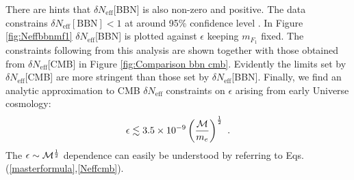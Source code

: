 \documentclass[12pt]{article}
\begin{document}
There are hints that $\delta N _{\text{eff}}$[BBN] is also non-zero and positive. The data constrains $\delta N _{\text{eff}}[\text{BBN}] < 1$ at around 95\% confidence level \cite{izotov}. In Figure \ref{fig:Neffbbnmf1} $\delta N _{\text{eff}}$[BBN] is plotted against $\epsilon$ keeping $m _{F_1}$ fixed. The constraints following from this analysis are shown together with those obtained from $\delta N _{\text{eff}}$[CMB] in Figure \ref{fig:Comparison bbn cmb}. Evidently the limits set by $\delta N _{\text{eff}}$[CMB] are more stringent than those set by $\delta N _{\text{eff}}$[BBN]. Finally, we find an analytic approximation to CMB $\delta N _{\text{eff}}$ constraints on $\epsilon$ arising from early Universe cosmology:
%
\begin{eqnarray}
\epsilon \lesssim 3.5 \times 10 ^{-9} \left ( \frac{{\cal M}}{m _e} \right ) ^{\frac{1}{2}} \ .
\label{constraints}
\end{eqnarray}
%
The $\epsilon \sim {\cal M} ^{\frac{1}{2}}$ dependence can easily be understood by referring to Eqs.(\ref{masterformula},\ref{Neffcmb}).
\end{document}
